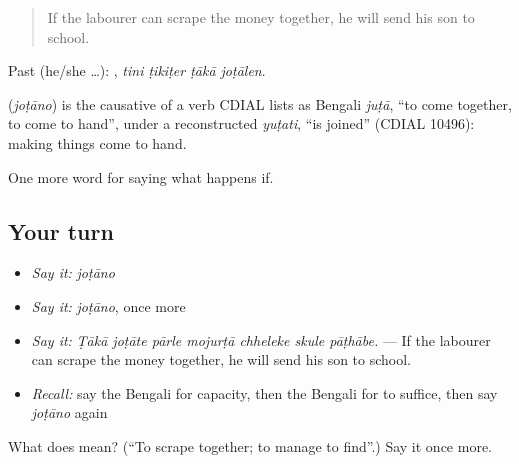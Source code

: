 \begin{quote}
If the labourer can scrape the money together, he will send his son to school.
\end{quote}

Past (he/she …):    , \emph{tini ṭikiṭer ṭākā joṭālen}.

\begin{cousinweb}
\textbf{} (\emph{joṭāno}) is the causative of a verb CDIAL lists as Bengali \emph{juṭā}, \textquotedblleft{}to come together, to come to hand\textquotedblright{}, under a reconstructed \emph{yuṭati}, \textquotedblleft{}is joined\textquotedblright{} (CDIAL 10496): making things come to hand.
\end{cousinweb}

\begin{grammarlens}[title={What you've built}]
One more word for saying what happens if.
\end{grammarlens}

\subsection*{Your turn}
\begin{itemize}
\raggedright
  \item \emph{Say it:} \emph{joṭāno}
  \item \emph{Say it:} \emph{joṭāno}, once more
  \item \emph{Say it:} \emph{Ṭākā joṭāte pārle mojurṭā chheleke skule pāṭhābe.} — If the labourer can scrape the money together, he will send his son to school.
  \item \emph{Recall:} say the Bengali for capacity, then the Bengali for to suffice, then say \emph{joṭāno} again
\end{itemize}

\begin{tcolorbox}[breakable,colback=teal!4,colframe=teal!35!black,title={Before you move on}]
What does  mean? (\textquotedblleft{}To scrape together; to manage to find\textquotedblright{}.) Say it once more.
\end{tcolorbox}
